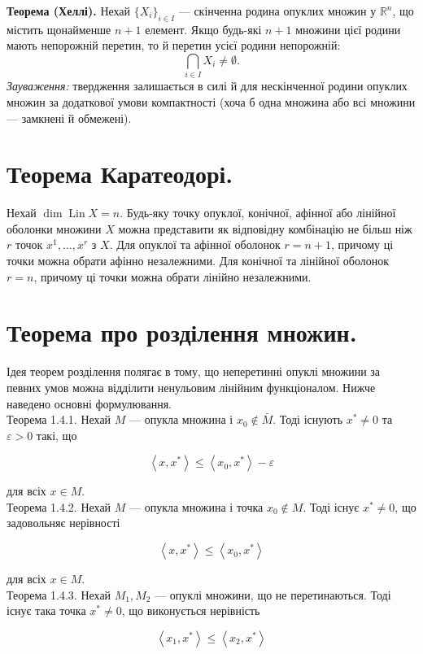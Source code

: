 \documentclass[12pt,a4paper]{extarticle}
\numberwithin{section}{part}
\begin{document}
\textbf{Теорема (Хеллі).} Нехай $\{X_i\}_{i \in I}$ --- скінченна родина опуклих множин у $\mathbb{R}^n$, що містить щонайменше $n + 1$ елемент. Якщо будь-які $n + 1$ множини цієї родини мають непорожній перетин, то й перетин усієї родини непорожній:
$$
\bigcap_{i \in I} X_i \neq \emptyset.
$$
\textit{Зауваження:} твердження залишається в силі й для нескінченної родини опуклих множин за додаткової умови компактності (хоча б одна множина або всі множини --- замкнені й обмежені).

\section{Теорема Каратеодорі.}
Нехай $\operatorname{dim} \operatorname{Lin} X=n$. Будь-яку точку опуклої, конічної, афінної або лінійної оболонки множини $X$ можна представити як відповідну комбінацію не більш ніж $r$ точок $x^{1}, \ldots, x^{r}$ з $X$. Для опуклої та афінної оболонок $r=n+1$, причому ці точки можна обрати афінно незалежними. Для конічної та лінійної оболонок $r=n$, причому ці точки можна обрати лінійно незалежними.

\section{Теорема про розділення множин.}
Ідея теорем розділення полягає в тому, що неперетинні опуклі множини за певних умов можна відділити ненульовим лінійним функціоналом. Нижче наведено основні формулювання.\\
Теорема 1.4.1. Нехай $M$ --- опукла множина і $x_{0} \notin \bar{M}$. Тоді існують $x^{*} \neq 0$ та $\varepsilon>0$ такі, що

$$
\left\langle x, x^{*}\right\rangle \leq\left\langle x_{0}, x^{*}\right\rangle-\varepsilon
$$

для всіх $x \in M$.\\
Теорема 1.4.2. Нехай $M$ --- опукла множина і точка $x_{0} \notin M$. Тоді існує $x^{*} \neq 0$, що задовольняє нерівності

$$
\left\langle x, x^{*}\right\rangle \leq\left\langle x_{0}, x^{*}\right\rangle
$$

для всіх $x \in M$.\\
Теорема 1.4.3. Нехай $M_{1}, M_{2}$ --- опуклі множини, що не перетинаються. Тоді існує така точка $x^{*} \neq 0$, що виконується нерівність

$$
\left\langle x_{1}, x^{*}\right\rangle \leq\left\langle x_{2}, x^{*}\right\rangle
$$
\end{document}

